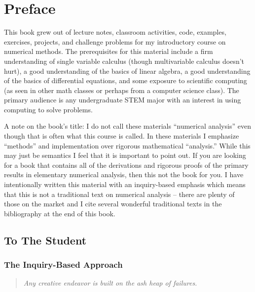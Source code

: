 \frontmatter
\chapter{Preface}
This book grew out of lecture notes, classroom activities, code, examples, exercises,
projects, and challenge problems for my introductory course on
numerical methods.  The prerequisites for this material include a firm understanding of
single variable calculus (though multivariable calculus doesn't hurt), a good
understanding of the basics of linear algebra, a good understanding of the basics of
differential equations, and some exposure to scientific computing (as seen in other math
classes or perhaps from a computer science class). The primary audience is any
undergraduate STEM major with an interest in using computing to solve problems.

A note on the book's title: I do not call these materials ``numerical
analysis'' even though that is often what this course is called.  In these materials I
emphasize ``methods'' and implementation over rigorous mathematical ``analysis.''  While
this may just be semantics I feel that it is important to point out.  If you are looking
for a book that contains all of the derivations and rigorous proofs of the primary results
in elementary numerical analysis, then this not the book for you.  I have
intentionally written this material with an inquiry-based emphasis which means that this
is not a traditional text on numerical analysis -- there are plenty of those on the market
and I cite several wonderful traditional texts in the bibliography at the end of this
book.

\section{To The Student}

\subsection{The Inquiry-Based Approach}
\begin{quote}
    {\it Any creative endeavor is built on the ash heap of failures.}
\end{quote}

